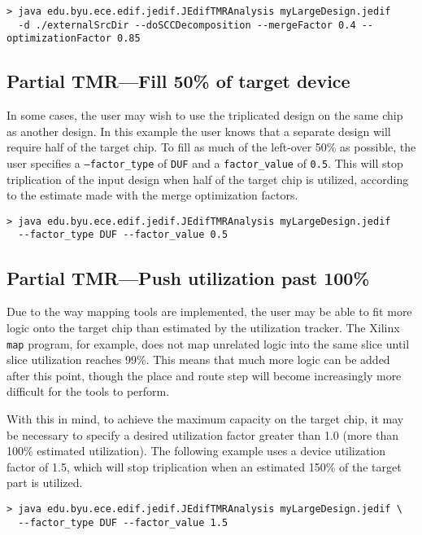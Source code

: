 \begin{verbatim}
> java edu.byu.ece.edif.jedif.JEdifTMRAnalysis myLargeDesign.jedif 
  -d ./externalSrcDir --doSCCDecomposition --mergeFactor 0.4 --optimizationFactor 0.85
\end{verbatim}


\subsection{Partial TMR---Fill 50\% of target device}
In some cases, the user may wish to use the triplicated design on the same chip 
as another design. In this example the user knows that a separate design will 
require half of the target chip. To fill as much of the left-over 50\% as 
possible, the user specifies a \texttt{--factor\_type} of \texttt{DUF} and a 
\texttt{factor\_value} of \texttt{0.5}. This will stop triplication of the 
input design when half of the target chip is utilized, according to the 
estimate made with the merge optimization factors.

\begin{verbatim}
> java edu.byu.ece.edif.jedif.JEdifTMRAnalysis myLargeDesign.jedif 
  --factor_type DUF --factor_value 0.5
\end{verbatim}


\subsection{Partial TMR---Push utilization past 100\%}
Due to the way mapping tools are implemented, the user may be able to fit more 
logic onto the target chip than estimated by the utilization tracker. The 
Xilinx \texttt{map} program, for example, does not map unrelated logic into the 
same slice until slice utilization reaches 99\%. This means that much more 
logic can be added after this point, though the place and route step will 
become increasingly more difficult for the tools to perform.

With this in mind, to achieve the maximum capacity on the target chip, it may 
be necessary to specify a desired utilization factor greater than 1.0 (more 
than 100\% estimated utilization). The following example uses a device 
utilization factor of 1.5, which will stop triplication when an estimated 150\% 
of the target part is utilized.

\begin{verbatim}
> java edu.byu.ece.edif.jedif.JEdifTMRAnalysis myLargeDesign.jedif \
  --factor_type DUF --factor_value 1.5
\end{verbatim}


